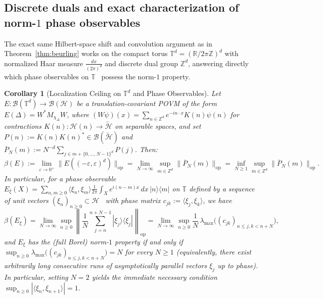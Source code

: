 \documentclass[11pt,a4paper]{article}
\newtheorem{corollary}[theorem]{Corollary}
\theoremstyle{definition}
\theoremstyle{remark}
\newcommand{\HH}{\mathcal{H}}
\newcommand{\tH}{\widetilde{\mathcal{H}}}
\newcommand{\BB}{\mathcal{B}}
\newcommand{\Bor}{\mathcal{B}}
\newcommand{\RR}{\mathbb{R}}
\newcommand{\ZZ}{\mathbb{Z}}
\newcommand{\TT}{\mathbb{T}}
\newcommand{\op}{\mathrm{op}}
\newcommand{\ket}[1]{|#1\rangle}
\newcommand{\bra}[1]{\langle #1|}
\newcommand{\ip}[2]{\langle #1, #2 \rangle}
\newcommand{\norm}[1]{\|#1\|}
\begin{document}
\subsection{Discrete duals and exact characterization of norm-$1$ phase observables}

The exact same Hilbert-space shift and convolution argument as in Theorem~\ref{thm:beurling} works on the compact torus $\TT^d = (\RR/2\pi\ZZ)^d$ with normalized Haar measure $\frac{dx}{(2\pi)^d}$ and discrete dual group $\ZZ^d$, answering directly which phase observables on $\TT$~\cite[Sec.~5.2]{Heinonen2003} possess the norm-$1$ property.

\begin{corollary}[Localization Ceiling on $\TT^d$ and Phase Observables]\label{cor:phase}
Let $E:\Bor(\TT^d)\to\BB(\HH)$ be a translation-covariant POVM of the form $E(\Delta)=W^* M_{\chi_\Delta} W$, where $(W\psi)(x)=\sum_{n\in\ZZ^d} e^{-in\cdot x}K(n)\psi(n)$ for contractions $K(n):\HH(n)\to\tH$ on separable spaces, and set $P(n):=K(n)K(n)^*\in\BB(\tH)$ and $\overline{P}_N(m):=N^{-d}\sum_{j\in m+\{0,\dots,N-1\}^d} P(j)$. Then:
\begin{equation}\label{eq:torus-ceiling}
\beta(E) := \lim_{\varepsilon\to 0^+}\norm{E((-\varepsilon,\varepsilon)^d)}_{\op}
= \lim_{N\to\infty}\sup_{m\in\ZZ^d}\norm{\overline{P}_N(m)}_{\op}
= \inf_{N\ge 1}\sup_{m\in\ZZ^d}\norm{\overline{P}_N(m)}_{\op}.
\end{equation}
In particular, for a phase observable $E_\xi(X)=\sum_{n,m\ge 0}\ip{\xi_n}{\xi_m}\frac{1}{2\pi}\int_X e^{i(n-m)x}\,dx\,\ket{n}\bra{m}$ on $\TT$ defined by a sequence of unit vectors $(\xi_n)_{n\ge 0}\subset\HH$~\cite[Sec.~5.2]{Heinonen2003} with phase matrix $c_{jk}:=\ip{\xi_j}{\xi_k}$, we have
\begin{equation}\label{eq:phase-ceiling}
\beta(E_\xi) = \lim_{N\to\infty}\sup_{n\ge 0}\left\|\frac{1}{N}\sum_{j=n}^{n+N-1}\ket{\xi_j}\bra{\xi_j}\right\|_{\op}
= \lim_{N\to\infty}\sup_{n\ge 0}\frac{1}{N}\,\lambda_{\max}\bigl((c_{jk})_{n\le j,k<n+N}\bigr),
\end{equation}
and $E_\xi$ has the (full Borel) norm-$1$ property if and only if $\sup_{n\ge 0}\lambda_{\max}\bigl((c_{jk})_{n\le j,k<n+N}\bigr)=N$ for every $N\ge 1$ (equivalently, there exist arbitrarily long consecutive runs of asymptotically parallel vectors $\xi_j$ up to phase). In particular, setting $N=2$ yields the immediate necessary condition $\sup_{n\ge 0}|\ip{\xi_n}{\xi_{n+1}}|=1$.
\end{corollary}
\end{document}
